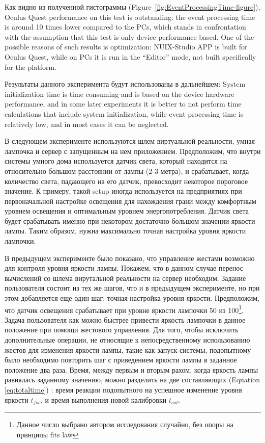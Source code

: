 Как видно из полученной гистограммы (Figure~\ref{fig:EventProcessingTime-figure}), Oculus Quest performance on this test is outstanding: the event processing time is around 10 times lower compared to the PCs, which stands in confrontation with the assumption that this test is only device performance-based. One of the possible reasons of such results is optimization: NUIX-Studio APP is built for Oculus Quest, while on PCs it is run in the “Editor” mode, not built specifically for the platform.


Результаты данного эксперимента будут использованы в дальнейшем: System initialization time is time consuming and is based on the device hardware performance, and in some later experiments it is better to not perform time calculations that include system initialization, while event processing time is relatively low, and in most cases it can be neglected.

В следующем эксперименте используются шлем виртуальной реальности, умная лампочка и сервер с запущенным на нем приложением. Предположим, что внутри системы умного дома используется датчик света, который находится на относительно большом расстоянии от лампы (2-3 метра), и срабатывает, когда количество света, падающего на его датчик, превосходит некоторое пороговое значение. К примеру, такой setup иногда используется на предприятиях при первоначальной настройке освещения для нахождения грани между комфортным уровнем освещения и оптимальным уровнем энергопотребления. Датчик света будет срабатывать именно при некотором достаточно большом значении яркости лампы. Таким образом, нужна максимально точная настройка уровня яркости лампочки.

В предыдущем эксперименте было показано, что управление жестами возможно для контроля уровня яркости лампы. Покажем, что в данном случае перенос вычислений со шлема вирутальной реальности на сервер необходим. Задание пользователя состоит из тех же шагов, что и в предыдущем эксперименте, но при этом добавляется еще один шаг: точная настройка уровня яркости. Предположим, что датчик освещения срабатывает при уровне яркости лампочки 50 из 100\footnote{Данное число выбрано автором исследования случайно, без опоры на принципы fits law}. Задача пользователя как можно быстрее привести яркость лампочки в данное положение при помощи жестового управления. Для того, чтобы исключить дополнительные операции, не относящие к непосредственному использованию жестов для изменения яркости лампы, такие как запуск системы, подопытному было необходимо повторить шаг с приведением яркости лампы в заданное положение два раза. Время, между первым и вторым рахом, когда яркость лампы равнялась заданному значению, можно разделить на две составляющих (Equation \eqref{eq:totaltime}) : время реакции подопытного на успешное изменение уровня яркости $t_{foc}$, и время выполнения новой калибровки $t_{cal}$.

